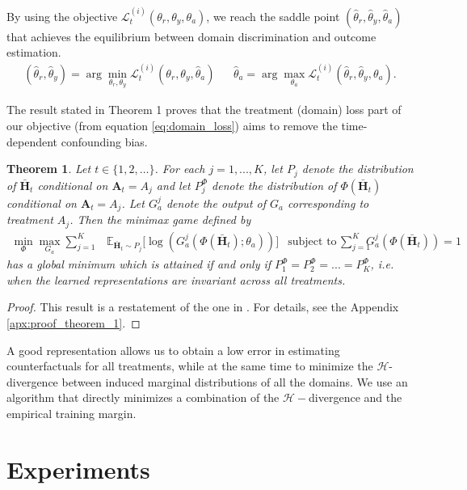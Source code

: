 \documentclass{article} %
\newtheorem{theorem}{Theorem}
\newcommand{\vc}[1]{\mathbf{#1}}
\begin{document}
	By using the objective $\mathcal{L}^{(i)}_t(\theta_r, \theta_y, \theta_a)$, we reach the saddle point $(\hat{\theta}_{r},  \hat{\theta}_y, \hat{\theta}_a) $ that achieves the equilibrium between domain discrimination and outcome estimation. 
	 \begin{align}
	 (\hat{\theta}_r, \hat{\theta}_y) = \arg \min_{\theta_r, \theta_y} \mathcal{L}^{(i)}_t(\theta_r, \theta_y, \hat{\theta}_a) &&  \hat{\theta}_a = \arg \max_{\theta_a} \mathcal{L}^{(i)}_t(\hat{\theta}_r, \hat{\theta}_y, \theta_a).
	 \end{align}
	 
	 
	 The result stated in Theorem 1 proves that the treatment (domain) loss part of our objective (from equation \ref{eq:domain_loss}) aims to  remove the time-dependent confounding bias. 
	 
	 \begin{theorem}
	 Let $t \in \{1, 2, \dots\}$. For each $j = 1, ..., K$, let $P_j$ denote the distribution of $\bar{\vc{H}}_t$ conditional on $\vc{A}_t = A_j$ and let $P^{\Phi}_j$ denote the distribution of $\Phi(\bar{\vc{H}}_t)$ conditional on $\vc{A}_t = A_j$. Let $G_a^j$ denote the output of $G_a$ corresponding to treatment $A_j$. Then the minimax game defined by
	 \begin{align} \label{eq:minimax}
	     \min_{\Phi} \max_{G_a} \sum_{j = 1}^K &\mathbb{E}_{\bar{\vc{H}}_t \sim P_j} \Big[\log(G_a^j(\Phi(\bar{\vc{H}}_t); \theta_a))\Big] &
	     \text{subject to } \sum_{j = 1}^K &G_a^j(\Phi(\bar{\vc{H}}_t)) = 1
	 \end{align}
	 has a global minimum which is attained if and only if $P^{\Phi}_1 = P^{\Phi}_2 = ... = P^{\Phi}_K$, i.e. when the learned representations are invariant across all treatments. 
	 \end{theorem}
	 \begin{proof}
	 This result is a restatement of the one in \citet{li2018deep}. For details, see the Appendix \ref{apx:proof_theorem_1}.
	 \end{proof}


	 A good representation allows us to obtain a low error in estimating counterfactuals for all treatments, while at the same time to minimize the $\mathcal{H}$-divergence between induced marginal distributions of all the domains. We use an algorithm that directly minimizes a combination of the $\mathcal{H}-$divergence and the empirical training margin. 
	

\section{Experiments}
	
\end{document}
